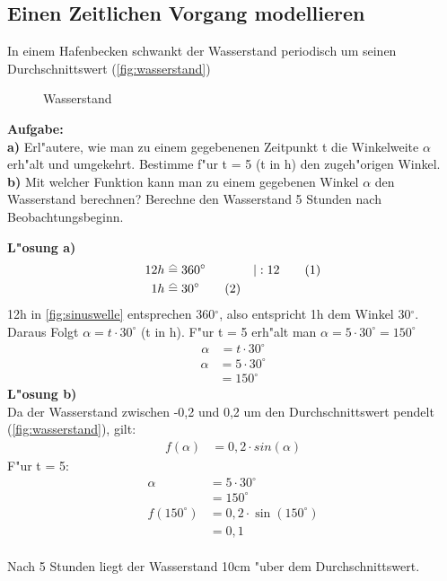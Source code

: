 \documentclass{standalone}
\begin{document}
\subsection{Einen Zeitlichen Vorgang modellieren}

\noindent In einem Hafenbecken schwankt der Wasserstand periodisch um seinen Durchschnittswert (\autoref{fig:wasserstand})

\begin{figure}[hb!]
  \center
  \def\svgwidth{500px}
  
  \caption{Wasserstand}
  \label{fig:wasserstand}
\end{figure}

\noindent \textbf{Aufgabe:}\\
\noindent \textbf{a)} Erl{"a}utere, wie man zu einem gegebenenen Zeitpunkt t die Winkelweite $\alpha$ erh{"a}lt und umgekehrt. Bestimme f{"u}r t = 5 (t in h) den zugeh{"o}rigen Winkel.\\
\noindent \textbf{b)} Mit welcher Funktion kann man zu einem gegebenen Winkel $\alpha$ den Wasserstand berechnen? Berechne den Wasserstand 5 Stunden nach Beobachtungsbeginn.\\

\newpage

\noindent \textbf{L{"o}sung a)}
\begin{align}
  12h & \equalhat 360^\circ        & |:12\tag{1} \\
  1h  & \equalhat 30^\circ \tag{2}
\end{align}
\noindent 12h in {\autoref{fig:sinuswelle}} entsprechen 360$^\circ$, also entspricht 1h dem Winkel 30$^\circ$.
Daraus Folgt $\alpha = t \cdot 30^\circ$ (t in h). F{"u}r t = 5 erh{"a}lt man $\alpha = 5 \cdot 30^\circ = 150^\circ$
\begin{align}
  \alpha & = t \cdot 30^\circ \nonumber 
\end{align}
\begin{align}
  \alpha & = 5 \cdot 30^\circ \tag{1} \\ & = 150^\circ \tag{2}
\end{align}
\noindent \textbf{L{"o}sung b)}\\
Da der Wasserstand zwischen -0,2 und 0,2 um den Durchschnittswert pendelt (\autoref{fig:wasserstand}), gilt:
\begin{align}
  f(\alpha) & = 0,2 \cdot sin(\alpha)     \nonumber
\end{align}
\noindent F{"u}r t = 5:
\begin{align}
  \alpha       & = 5 \cdot 30^\circ     \tag{1}      \\
               & = 150^\circ   \tag{2}               \\
  f(150^\circ) & = 0,2 \cdot \sin(150^\circ) \tag{3} \\
               & = 0,1 \tag{4}
\end{align}\\
\noindent Nach 5 Stunden liegt der Wasserstand 10cm {"u}ber dem Durchschnittswert.
\end{document}
